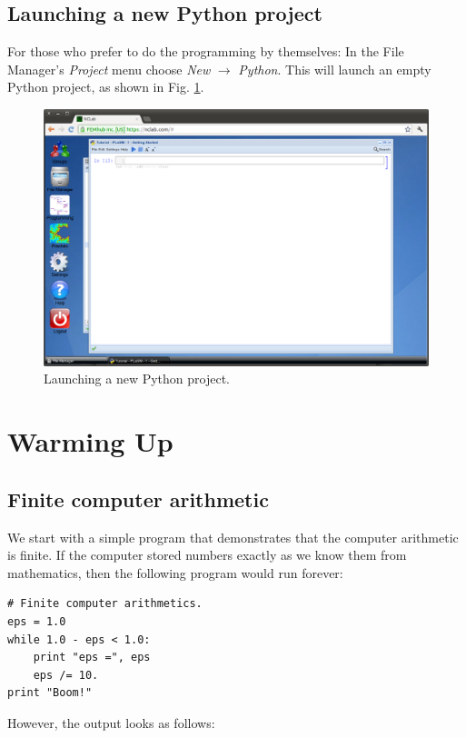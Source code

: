 \documentclass[article,A4,12pt]{llncs}
\begin{document}
\subsection{Launching a new Python project}

For those who prefer to do the programming by themselves: 
In the File Manager's {\em Project} menu 
choose {\em New} $\rightarrow$ {\em Python}. This will launch an 
empty Python project, as shown in Fig. \ref{fig:python}.


\begin{figure}[!ht]
\begin{center}
\includegraphics[width=\textwidth]{img/python.png}
\end{center}
\caption{Launching a new Python project.}
\label{fig:python}
\end{figure}
\noindent

\newpage


\section{Warming Up}



\subsection{Finite computer arithmetic}

We start with a simple program that demonstrates that the computer 
arithmetic is finite. If the computer stored numbers exactly 
as we know them from mathematics, then the following program 
would run forever:

\begin{verbatim}
# Finite computer arithmetics.
eps = 1.0
while 1.0 - eps < 1.0:
    print "eps =", eps
    eps /= 10.
print "Boom!"
\end{verbatim}
However, the output looks as follows:
\end{document}
